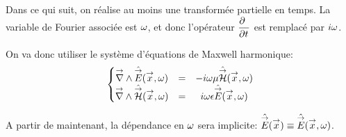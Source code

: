 Dans ce qui suit, on réalise au moins une transformée partielle en temps. La variable de Fourier associée est \(\w\), et donc l'opérateur \(\ddr{t}{~}\) est remplacé par \(i\w\).


On va donc utiliser le système d'équations de Maxwell harmonique:
\begin{equation}
    \left\lbrace
    \begin{matrix}
    \vrot \hat \vE(\vx,\w)  &=& -i \omega \mu \hat \vH(\vx,\w)  \\
    \vrot \hat \vH(\vx,\w)  &=& i \omega \eps \hat \vE(\vx,\w)
    \end{matrix}
    \right.
    \label{eq:imp_fourier:intro:maxwell_harmonique}
\end{equation}

A partir de maintenant, la dépendance en \(\w\) sera implicite: \(\hat \vE(\vx) \equiv \hat \vE (\vx, \w)\).